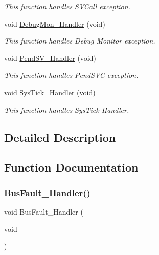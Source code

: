 \begin{DoxyCompactItemize}
\begin{DoxyCompactList}\small\item\em This function handles S\+V\+Call exception. \end{DoxyCompactList}\item 
void \mbox{\hyperlink{group___template___project_gadbdfb05858cc36fc520974df37ec3cb0}{Debug\+Mon\+\_\+\+Handler}} (void)
\begin{DoxyCompactList}\small\item\em This function handles Debug Monitor exception. \end{DoxyCompactList}\item 
void \mbox{\hyperlink{group___template___project_ga6303e1f258cbdc1f970ce579cc015623}{Pend\+S\+V\+\_\+\+Handler}} (void)
\begin{DoxyCompactList}\small\item\em This function handles Pend\+S\+VC exception. \end{DoxyCompactList}\item 
void \mbox{\hyperlink{group___template___project_gab5e09814056d617c521549e542639b7e}{Sys\+Tick\+\_\+\+Handler}} (void)
\begin{DoxyCompactList}\small\item\em This function handles Sys\+Tick Handler. \end{DoxyCompactList}\end{DoxyCompactItemize}


\subsection{Detailed Description}


\subsection{Function Documentation}
\mbox{\label{group___template___project_ga850cefb17a977292ae5eb4cafa9976c3}} 
\subsubsection{\texorpdfstring{Bus\+Fault\+\_\+\+Handler()}{BusFault\_Handler()}}
{\footnotesize\ttfamily void Bus\+Fault\+\_\+\+Handler (\begin{DoxyParamCaption}\item[{void}]{ }\end{DoxyParamCaption})}



